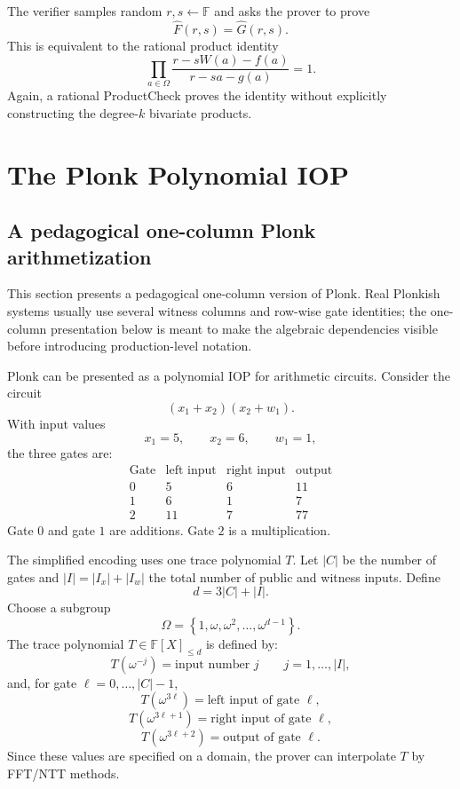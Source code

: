 \documentclass[11pt]{article}
\newcommand{\F}{\mathbb{F}}
\newcommand{\polydeg}[1]{\F[X]_{\le #1}}
\newcommand{\set}[1]{\left\{#1\right\}}
\begin{document}
The verifier samples random $r,s\leftarrow\F$ and asks the prover to prove
\[
    \widehat F(r,s)=\widehat G(r,s).
\]
This is equivalent to the rational product identity
\[
    \prod_{a\in\Omega}
    \frac{r-sW(a)-f(a)}{r-sa-g(a)}
    =1.
\]
Again, a rational ProductCheck proves the identity without explicitly constructing the degree-$k$ bivariate products.

\section{The Plonk Polynomial IOP}
\label{sec:plonk-iop}

\subsection{A pedagogical one-column Plonk arithmetization}

This section presents a pedagogical one-column version of Plonk. Real Plonkish systems usually use several witness columns and row-wise gate identities; the one-column presentation below is meant to make the algebraic dependencies visible before introducing production-level notation.

Plonk can be presented as a polynomial IOP for arithmetic circuits. Consider the circuit
\[
    (x_1+x_2)(x_2+w_1).
\]
With input values
\[
    x_1=5,
    \qquad
    x_2=6,
    \qquad
    w_1=1,
\]
the three gates are:
\[
\begin{array}{c|ccc}
\text{Gate} & \text{left input} & \text{right input} & \text{output}\\
\hline
0 & 5 & 6 & 11\\
1 & 6 & 1 & 7\\
2 & 11 & 7 & 77
\end{array}
\]
Gate $0$ and gate $1$ are additions. Gate $2$ is a multiplication.

The simplified encoding uses one trace polynomial $T$. Let $|C|$ be the number of gates and $|I|=|I_x|+|I_w|$ the total number of public and witness inputs. Define
\[
    d=3|C|+|I|.
\]
Choose a subgroup
\[
    \Omega=\set{1,\omega,\omega^2,\ldots,\omega^{d-1}}.
\]
The trace polynomial $T\in\polydeg{d}$ is defined by:
\[
    T(\omega^{-j})=\text{input number }j
    \qquad j=1,\ldots,|I|,
\]
and, for gate $\ell=0,\ldots,|C|-1$,
\[
    T(\omega^{3\ell})=\text{left input of gate }\ell,
\]
\[
    T(\omega^{3\ell+1})=\text{right input of gate }\ell,
\]
\[
    T(\omega^{3\ell+2})=\text{output of gate }\ell.
\]
Since these values are specified on a domain, the prover can interpolate $T$ by FFT/NTT methods.
\end{document}
